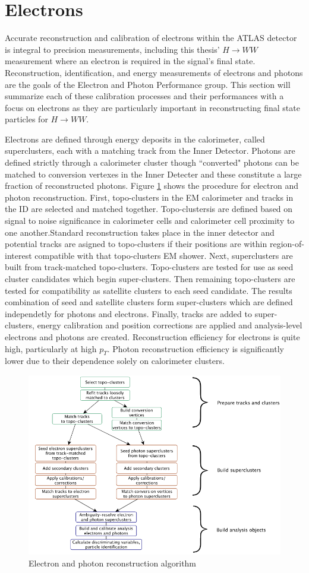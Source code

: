 \section{Electrons}
Accurate reconstruction and calibration of electrons within the ATLAS detector is integral to precision measurements, including this thesis' $H\rightarrow WW$ measurement where an electron is required in the signal's final state. Reconstruction, identification, and energy measurements of electrons and photons are the goals of the Electron and Photon Performance group.  This section will summarize each of these calibration processes and their performances with a focus on electrons as they are particularly important in reconstructing final state particles for $H\rightarrow WW$. 

Electrons are defined through energy deposits in the calorimeter, called superclusters, each with a matching track from the Inner Detector. Photons are defined strictly through a calorimeter cluster though ``converted" photons can be matched to conversion vertexes in the Inner Detecter and these constitute a large fraction of reconstructed photons. Figure \ref{fig:ElectroReco} shows the procedure for electron and photon reconstruction. First, topo-clusters in the EM calorimeter and tracks in the ID are selected and matched together. Topo-clustersis are defined based on signal to noise significance in calorimeter cells and calorimeter cell proximity to one another.Standard reconstruction takes place in the inner detector and potential tracks are asigned to topo-clusters if their positions are within region-of-interest compatible with that topo-clusters EM shower. Next, superclusters are built from track-matched topo-clusters. Topo-clusters are tested for use as seed cluster candidates which begin super-clusters. Then remaining topo-clusters are tested for compatibility as satellite clusters to each seed candidate. The results combination of seed and satellite clusters form super-clusters which are defined independetly for photons and electrons.  Finally, tracks are added to super-clusters, energy calibration and position corrections are applied and analysis-level electrons and photons are created. Reconstruction efficiency for electrons is quite high, particularly at high $p_T$. Photon reconstruction efficiency is significantly lower due to their dependence solely on calorimeter clusters. 

\begin{figure}[!h]
        \centering
    \includegraphics[width=.6\textwidth]{Pictures/ElectroReco.png}
    \caption{ Electron and photon reconstruction algorithm \cite{ElectronPhotonPerformance}}
    \label{fig:ElectroReco}
\end{figure}
 
